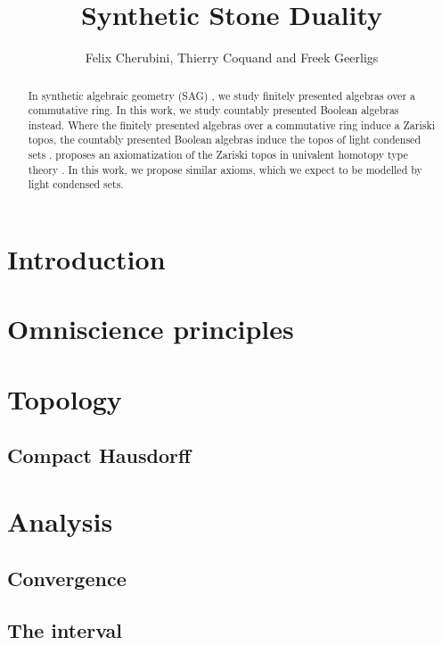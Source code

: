 \documentclass{../util/zariski-small}
\title{Synthetic Stone Duality}
\begin{document}
\author{Felix Cherubini, Thierry Coquand and Freek Geerligs}

\maketitle

\begin{abstract}
In synthetic algebraic geometry (SAG) \cite{draft}, we study finitely presented algebras over a commutative ring. 
In this work, we study countably presented Boolean algebras instead. 
Where the finitely presented algebras over a commutative ring induce a Zariski topos, 
the countably presented Boolean algebras induce the topos of light condensed sets \cite{Scholze}. 
\cite{draft} proposes an axiomatization of the Zariski topos in univalent homotopy type theory \cite{hott}. 
In this work, we propose similar axioms, which we expect to be modelled by light condensed sets. 
\end{abstract} 

\section*{Introduction}

%

\section{Omniscience principles}



\section{Topology}

\subsection{Compact Hausdorff}


\section{Analysis}

\subsection{Convergence}



\subsection{The interval}
%


\printbibliography
\end{document}
